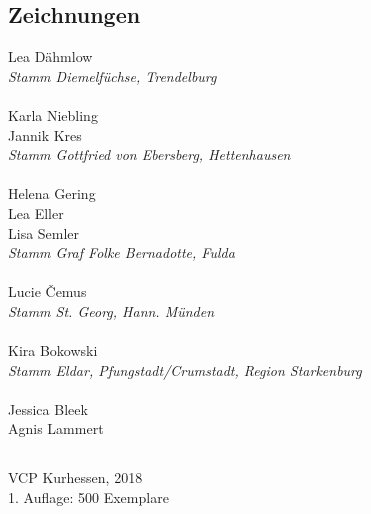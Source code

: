 \begin{centering}
\begin{multicols}{2}
\subsection*{Zeichnungen}
Lea Dähmlow \\ \textit{Stamm Diemelfüchse, Trendelburg} \\ ~\\
Karla Niebling \\ Jannik Kres \\ \textit{Stamm Gottfried von Ebersberg, Hettenhausen} \\ ~\\
Helena Gering \\ Lea Eller \\ Lisa Semler \\ \textit{Stamm Graf Folke Bernadotte, Fulda} \\ ~\\
Lucie \v{C}emus \\ \textit{Stamm St. Georg, Hann. Münden} \\ ~\\
Kira Bokowski \\ \textit{Stamm Eldar, Pfungstadt/Crumstadt, Region Starkenburg} \\ ~\\
Jessica Bleek \\ Agnis Lammert \\

\end{multicols}

\vfill

\subsection*{}
VCP Kurhessen, 2018 \\
1. Auflage: 500 Exemplare

\end{centering}

